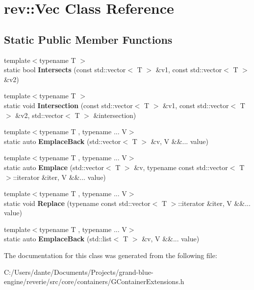 \hypertarget{classrev_1_1_vec}{}\section{rev\+::Vec Class Reference}
\label{classrev_1_1_vec}
\subsection*{Static Public Member Functions}
\begin{DoxyCompactItemize}
\item 
\mbox{\label{classrev_1_1_vec_a86d563363d5cbdc12c105fc264dff1fe}} 
{\footnotesize template$<$typename T $>$ }\\static bool {\bfseries Intersects} (const std\+::vector$<$ T $>$ \&v1, const std\+::vector$<$ T $>$ \&v2)
\item 
\mbox{\label{classrev_1_1_vec_af168d651fe497a0d8793880feb70967a}} 
{\footnotesize template$<$typename T $>$ }\\static void {\bfseries Intersection} (const std\+::vector$<$ T $>$ \&v1, const std\+::vector$<$ T $>$ \&v2, std\+::vector$<$ T $>$ \&intersection)
\item 
\mbox{\label{classrev_1_1_vec_abdfc4fbb095198a089422afdfb4c6f72}} 
{\footnotesize template$<$typename T , typename ... V$>$ }\\static auto {\bfseries Emplace\+Back} (std\+::vector$<$ T $>$ \&v, V \&\&... value)
\item 
\mbox{\label{classrev_1_1_vec_a9e5fbe1c52499ffe24590ada97b243c1}} 
{\footnotesize template$<$typename T , typename ... V$>$ }\\static auto {\bfseries Emplace} (std\+::vector$<$ T $>$ \&v, typename const std\+::vector$<$ T $>$\+::iterator \&iter, V \&\&... value)
\item 
\mbox{\label{classrev_1_1_vec_adf696b9d588abef35950ad2ddb549674}} 
{\footnotesize template$<$typename T , typename ... V$>$ }\\static void {\bfseries Replace} (typename const std\+::vector$<$ T $>$\+::iterator \&iter, V \&\&... value)
\item 
\mbox{\label{classrev_1_1_vec_ae098062ea1ab6fbf72953629f71c1d32}} 
{\footnotesize template$<$typename T , typename ... V$>$ }\\static auto {\bfseries Emplace\+Back} (std\+::list$<$ T $>$ \&v, V \&\&... value)
\end{DoxyCompactItemize}


The documentation for this class was generated from the following file\+:\begin{DoxyCompactItemize}
\item 
C\+:/\+Users/dante/\+Documents/\+Projects/grand-\/blue-\/engine/reverie/src/core/containers/G\+Container\+Extensions.\+h\end{DoxyCompactItemize}

